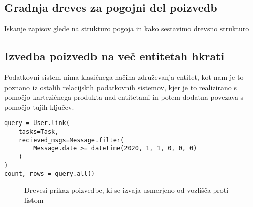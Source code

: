\documentclass[a4paper,12pt,openright]{book}
\begin{document}
        \subsection{Gradnja dreves za pogojni del poizvedb}
        \colorbox{BurntOrange}{Iskanje zapisov glede na strukturo pogoja in kako sestavimo drevsno strukturo}
        
        \subsection{Izvedba poizvedb na več entitetah hkrati}
            Podatkovni sistem nima klasičnega načina združevanja entitet, kot nam je to poznano iz ostalih relacijskih podatkovnih sistemov, kjer je to realizirano s pomočjo kartezičnega produkta nad entitetami in potem dodatna povezava s pomočjo tujih ključev.
            
\begin{verbatim}
query = User.link(
    tasks=Task,
    recieved_msgs=Message.filter(
        Message.date >= datetime(2020, 1, 1, 0, 0, 0)
    )
)
count, rows = query.all()
\end{verbatim}
                    
        \begin{figure}[h]
            \begin{center}
              \caption{Drevesi prikaz poizvedbe, ki se izvaja usmerjeno od vozlišča proti listom}
            \end{center}
            \end{figure}
        
\end{document}
